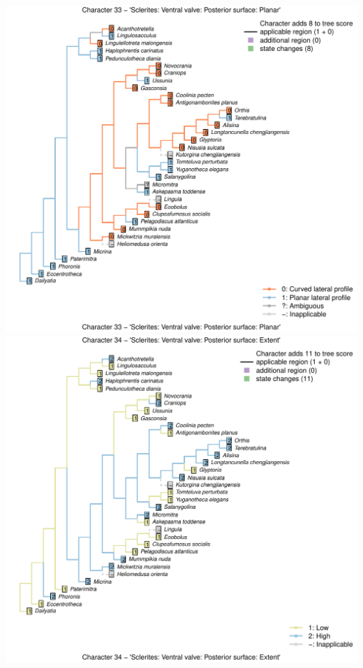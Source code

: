 \documentclass[]{book}
\theoremstyle{definition}
\theoremstyle{definition}
\theoremstyle{definition}
\theoremstyle{remark}
\begin{document}
\includegraphics{Brachiopod_phylogeny_files/figure-latex/unnamed-chunk-4-33.pdf}
\includegraphics{Brachiopod_phylogeny_files/figure-latex/unnamed-chunk-4-34.pdf}
\end{document}
